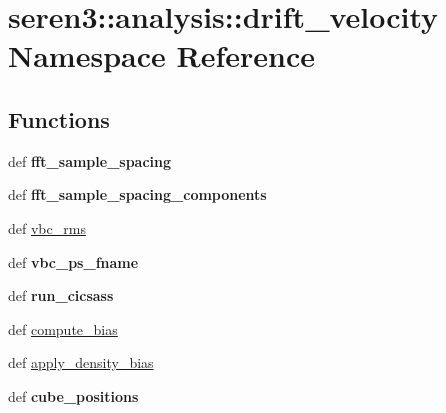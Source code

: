 \hypertarget{namespaceseren3_1_1analysis_1_1drift__velocity}{
\section{seren3::analysis::drift\_\-velocity Namespace Reference}
\label{namespaceseren3_1_1analysis_1_1drift__velocity}
}
\subsection*{Functions}
\begin{DoxyCompactItemize}
\item 
\hypertarget{namespaceseren3_1_1analysis_1_1drift__velocity_a101e66857a11f9b89d7c30ecd628579e}{
def {\bfseries fft\_\-sample\_\-spacing}}
\label{namespaceseren3_1_1analysis_1_1drift__velocity_a101e66857a11f9b89d7c30ecd628579e}

\item 
\hypertarget{namespaceseren3_1_1analysis_1_1drift__velocity_aadd743488a80d667d90c86e54837e747}{
def {\bfseries fft\_\-sample\_\-spacing\_\-components}}
\label{namespaceseren3_1_1analysis_1_1drift__velocity_aadd743488a80d667d90c86e54837e747}

\item 
def \hyperlink{namespaceseren3_1_1analysis_1_1drift__velocity_a00907fa38afd32b500ba8526a85cc3a5}{vbc\_\-rms}
\item 
\hypertarget{namespaceseren3_1_1analysis_1_1drift__velocity_a5aedcbcb5e95482105d7e59b5c1357b9}{
def {\bfseries vbc\_\-ps\_\-fname}}
\label{namespaceseren3_1_1analysis_1_1drift__velocity_a5aedcbcb5e95482105d7e59b5c1357b9}

\item 
\hypertarget{namespaceseren3_1_1analysis_1_1drift__velocity_a69ab6f0d08f50e2a7b0dcd6f8eee8a7a}{
def {\bfseries run\_\-cicsass}}
\label{namespaceseren3_1_1analysis_1_1drift__velocity_a69ab6f0d08f50e2a7b0dcd6f8eee8a7a}

\item 
def \hyperlink{namespaceseren3_1_1analysis_1_1drift__velocity_a1af4a4187aeed3a597ca4c733d18993e}{compute\_\-bias}
\item 
def \hyperlink{namespaceseren3_1_1analysis_1_1drift__velocity_ae09934064016aa37522bd7bcda3d1b63}{apply\_\-density\_\-bias}
\item 
\hypertarget{namespaceseren3_1_1analysis_1_1drift__velocity_a0ae157d294355bfca622a561854aa423}{
def {\bfseries cube\_\-positions}}
\label{namespaceseren3_1_1analysis_1_1drift__velocity_a0ae157d294355bfca622a561854aa423}

\end{DoxyCompactItemize}


